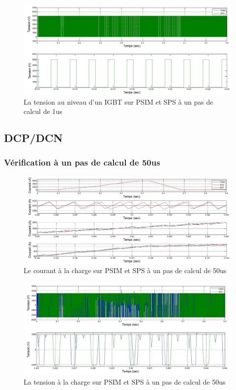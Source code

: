 \documentclass[11pt,letterpaper,final]{report}
\begin{document}
\begin{figure}[h!]
\centering
\includegraphics[scale=0.5]{Fig/Hacheur4Quadrants/HacheurTensionIGBT1u.jpg}
\caption{La tension au niveau d'un IGBT sur PSIM et SPS à un pas de calcul de 1us}
\label{hc_IG_ten_1}
\end{figure}


\clearpage

\subsection{DCP/DCN}

\subsubsection{Vérification à un pas de calcul de 50us}


\begin{figure}[h!]
\centering
\includegraphics[scale=0.5]{Fig/DCPDCN/DCPCourantCharge50u.jpg}
\caption{Le courant à la charge sur PSIM et SPS à un pas de calcul de 50us}
\label{DC_ch_cou_50}
\end{figure}


\begin{figure}[h!]
\centering
\includegraphics[scale=0.5]{Fig/DCPDCN/DCPTensionCharge50u.jpg}
\caption{La tension à la charge sur PSIM et SPS à un pas de calcul de 50us}
\label{DC_ch_ten_50}
\end{figure}
\end{document}
